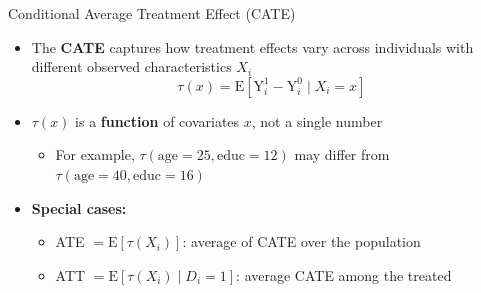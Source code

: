 \documentclass[hyperref={pdfpagelabels=false}]{beamer}
\begin{document}
\begin{frame}{Conditional Average Treatment Effect (CATE)}
	\begin{itemize}
		\item The \textbf{CATE} captures how treatment effects vary across individuals with different observed characteristics $X_i$
		\begin{equation*}
			\tau(x) = \mathrm{E}[\mathrm{Y}^{1}_{i} - \mathrm{Y}^{0}_{i} \mid X_{i} = x]
		\end{equation*}
		\vspace{0.2cm}
		\item $\tau(x)$ is a \textbf{function} of covariates $x$, not a single number
		\vspace{0.2cm}
		\begin{itemize}
			\item For example, $\tau(\text{age}=25, \text{educ}=12)$ may differ from $\tau(\text{age}=40, \text{educ}=16)$
		\end{itemize}
		\vspace{0.3cm}
		\item \textbf{Special cases:}
		\vspace{0.2cm}
		\begin{itemize}
			\item ATE $= \mathrm{E}[\tau(X_i)]$: average of CATE over the population
			\vspace{0.2cm}
			\item ATT $= \mathrm{E}[\tau(X_i) \mid D_i = 1]$: average CATE among the treated
		\end{itemize}
	\end{itemize}
\end{frame}
\end{document}
